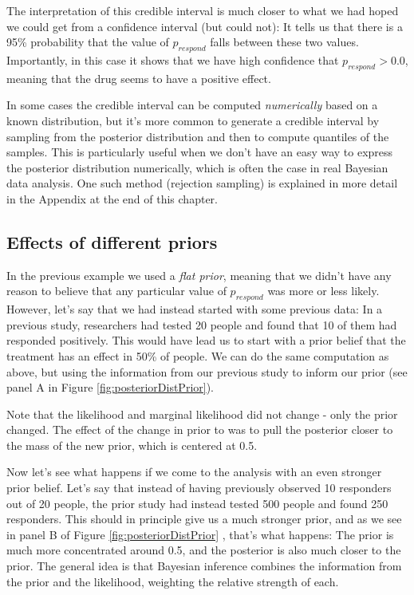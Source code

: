 \documentclass[
  12pt,
]{book}
\begin{document}
The interpretation of this credible interval is much closer to what we had hoped we could get from a confidence interval (but could not): It tells us that there is a 95\% probability that the value of \(p_{respond}\) falls between these two values. Importantly, in this case it shows that we have high confidence that \(p_{respond} > 0.0\), meaning that the drug seems to have a positive effect.

In some cases the credible interval can be computed \emph{numerically} based on a known distribution, but it's more common to generate a credible interval by sampling from the posterior distribution and then to compute quantiles of the samples. This is particularly useful when we don't have an easy way to express the posterior distribution numerically, which is often the case in real Bayesian data analysis. One such method (rejection sampling) is explained in more detail in the Appendix at the end of this chapter.

\hypertarget{effects-of-different-priors}{%
\subsection{Effects of different priors}\label{effects-of-different-priors}}

In the previous example we used a \emph{flat prior}, meaning that we didn't have any reason to believe that any particular value of \(p_{respond}\) was more or less likely. However, let's say that we had instead started with some previous data: In a previous study, researchers had tested 20 people and found that 10 of them had responded positively. This would have lead us to start with a prior belief that the treatment has an effect in 50\% of people. We can do the same computation as above, but using the information from our previous study to inform our prior (see panel A in Figure \ref{fig:posteriorDistPrior}).

Note that the likelihood and marginal likelihood did not change - only the prior changed. The effect of the change in prior to was to pull the posterior closer to the mass of the new prior, which is centered at 0.5.

Now let's see what happens if we come to the analysis with an even stronger prior belief. Let's say that instead of having previously observed 10 responders out of 20 people, the prior study had instead tested 500 people and found 250 responders. This should in principle give us a much stronger prior, and as we see in panel B of Figure \ref{fig:posteriorDistPrior} , that's what happens: The prior is much more concentrated around 0.5, and the posterior is also much closer to the prior. The general idea is that Bayesian inference combines the information from the prior and the likelihood, weighting the relative strength of each.
\end{document}
